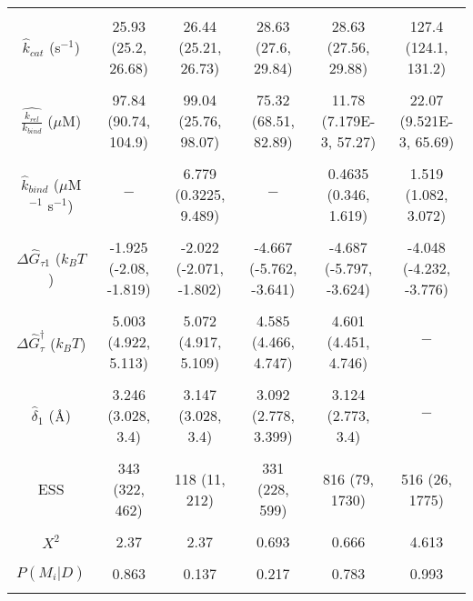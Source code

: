 \documentclass[10pt,letterpaper]{article}
\newcommand{\angstrom}{\mbox{\normalfont\AA}}
\begin{document}
\begin{table}[!ht]
\begin{adjustwidth}{-2.25in}{0in}
{\begin{tabular}{|c|cc|cc|c|}
&&&&& \\
\hline
&&&&& \\

$\hat{k}_{cat}$ (s$^{-1}$) & 25.93 (25.2, 26.68)  & 26.44 (25.21, 26.73) & 28.63 (27.6, 29.84) & 28.63 (27.56, 29.88)  & 127.4 (124.1, 131.2) \\
&&&&& \\

 $\hat{\frac{k_{rel}}{k_{bind}}}$ ($\mu$M) &  97.84 (90.74, 104.9) & 99.04 (25.76, 98.07) & 75.32 (68.51, 82.89) & 11.78 (7.179E-3, 57.27) & 22.07 (9.521E-3, 65.69) \\
&&&&& \\


$\hat{k}_{bind}$ ($\mu$M$^{-1}$ s$^{-1}$) & $-$ & 6.779 (0.3225, 9.489)  & $-$ &  0.4635 (0.346, 1.619)  & 1.519 (1.082, 3.072)  \\
&&&&& \\

$\Delta \hat{G}_{\tau 1}$ ($k_BT$) & -1.925 (-2.08, -1.819) & -2.022 (-2.071, -1.802) & -4.667 (-5.762, -3.641) & -4.687 (-5.797, -3.624) & -4.048 (-4.232, -3.776)  \\
&&&&& \\

$\Delta \hat{G}^\dag_{\tau}$  ($k_BT$)  & 5.003 (4.922, 5.113) &  5.072 (4.917, 5.109) & 4.585 (4.466, 4.747) & 4.601 (4.451, 4.746) & $-$ \\
&&&&& \\

$\hat{\delta}_1$ ($\angstrom$)  & 3.246 (3.028, 3.4) & 3.147 (3.028, 3.4)  & 3.092 (2.778, 3.399) & 3.124 (2.773, 3.4) & $-$ \\
&&&&& \\


ESS  & 343 (322, 462) & 118 (11, 212) & 331 (228, 599) & 816 (79, 1730)  & 516 (26, 1775)  \\
&&&&& \\
$X^2$  & 2.37 &  2.37 & 0.693 & 0.666 & 4.613  \\
&&&&& \\
$P(M_i|D)$  & 0.863  & 0.137 & 0.217 & 0.783 & 0.993  \\



&&&&& \\
\hline


\end{tabular}}
\end{adjustwidth}
\end{table}
\end{document}
